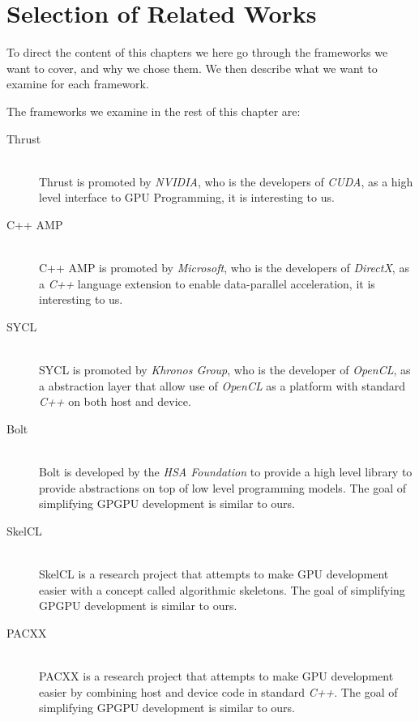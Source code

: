 \section{Selection of Related Works}


To direct the content of this chapters we here go through the frameworks we want to cover, and why we chose them. We then describe what we want to examine for each framework.

The frameworks we examine in the rest of this chapter are:
\begin{description}
\item[Thrust] \hfill \\
Thrust is promoted by \textit{NVIDIA}, who is the developers of \textit{CUDA}, as a high level interface to GPU Programming, it is interesting to us\cite{thrustNvidia}.
\item[C++ AMP] \hfill \\
C++ AMP is promoted by \textit{Microsoft}, who is the developers of \textit{DirectX}, as a \textit{C++} language extension to enable data-parallel acceleration, it is interesting to us\cite{microsoftCppAMP}.
\item[SYCL] \hfill \\
SYCL is promoted by \textit{Khronos Group}, who is the developer of \textit{OpenCL}, as a abstraction layer that allow use of \textit{OpenCL} as a platform with standard \textit{C++} on both host and device\cite{khronosSYCL}.
\item[Bolt] \hfill \\
Bolt is developed by the \textit{HSA Foundation} to provide a high level library to provide abstractions on top of low level programming models. The goal of simplifying GPGPU development is similar to ours\cite{boltDoc}.
\item[SkelCL] \hfill \\
SkelCL is a research project that attempts to make GPU development easier with a concept called algorithmic skeletons. The goal of simplifying GPGPU development is similar to ours\cite{skelclPaper}.
\item[PACXX] \hfill \\
PACXX is a research project that attempts to make GPU development easier by combining host and device code in standard \textit{C++}. The goal of simplifying GPGPU development is similar to ours\cite{pacxxPaper}.
\end{description}

